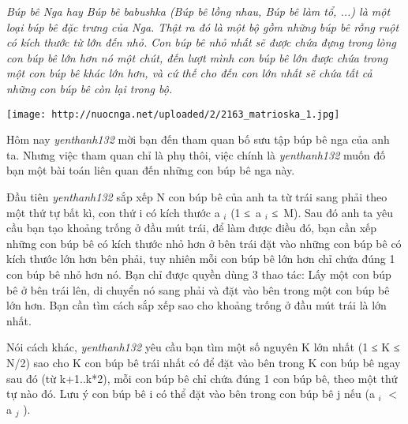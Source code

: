 \emph{    Búp bê Nga hay Búp bê babushka (Búp bê lồng nhau, Búp bê làm tổ, ...) là một loại búp bê đặc trưng của Nga. Thật ra đó là một bộ gồm những búp bê rỗng ruột có kích thước từ lớn đến nhỏ. Con búp bê nhỏ nhất sẽ được chứa đựng trong lòng con búp bê lớn hơn nó một chút, đến lượt mình con búp bê lớn được chứa trong một con búp bê khác lớn hơn, và cứ thế cho đến con lớn nhất sẽ chứa tất cả những con búp bê còn lại trong bộ.   }


\texttt{[image: http://nuocnga.net/uploaded/2/2163\_matrioska\_1.jpg]}

   Hôm nay   \emph{    yenthanh132   }   mời bạn đến tham quan bố sưu tập búp bê nga của anh ta. Nhưng việc tham quan chỉ là phụ thôi, việc chính là   \emph{    yenthanh132   }   muốn đố bạn một bài toán liên quan đến những con búp bê nga này.  

   Đầu tiên   \emph{    yenthanh132   }   sắp xếp N con búp bê của anh ta từ trái sang phải theo một thứ tự bất kì, con thứ i có kích thước a   $_    i   $   (1 ≤ a   $_    i   $   ≤ M). Sau đó anh ta yêu cầu bạn tạo khoảng trống ở đầu mút trái, để làm được điều đó, bạn cần xếp những con búp bê có kích thước nhỏ hơn ở bên trái đặt vào những con búp bê có kích thước lớn hơn bên phải, tuy nhiên mỗi con búp bê lớn hơn chỉ chứa đúng 1 con búp bê nhỏ hơn nó. Bạn chỉ được quyền dùng 3 thao tác: Lấy một con búp bê ở bên trái lên, di chuyển nó sang phải và       đặt vào bên trong      một con búp bê lớn hơn. Bạn cần tìm cách sắp xếp sao cho khoảng trống ở đầu mút trái là lớn nhất.  

   Nói cách khác,   \emph{    yenthanh132   }   yêu cầu bạn tìm một số nguyên K lớn nhất (1 ≤ K ≤ N/2) sao cho K con búp bê trái nhất có để đặt vào bên trong K con búp bê ngay sau đó (từ k+1..k*2), mỗi con búp bê chỉ chứa đúng 1 con búp bê, theo một thứ tự nào đó. Lưu ý con búp bê i có thể đặt vào bên trong con búp bê j nếu (a   $_    i   $   $<$ a   $_    j   $   ).  

\